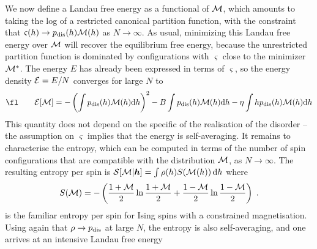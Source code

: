 \documentclass{iopart}
\begin{document}
We now define a Landau free energy as a functional of ${\cal M}$, which amounts to taking the log of a restricted canonical partition function, with the constraint that $\varsigma(h) \to p_{\rm dis}(h) {\cal M}(h)$ as $N\to\infty$.  As usual, minimizing this Landau free energy over ${\cal M}$ will recover the equilibrium free energy, because the unrestricted partition function is dominated by configurations with $\varsigma$ close to the minimizer ${\cal M}^*$.  
The energy $E$ has already been expressed in terms of $\varsigma$, so the energy density ${\cal E}=E/N$ converges for large $N$ to
\begin{eqnarray}
\fl\quad\quad
{\cal E}[\mm] =
- \left(\int \pdis(h) \mm(h) \mathrm{d}h \right)^{2} - B \int \pdis(h) \mm(h) \mathrm{d}h - \eta \int h \pdis(h) \mm(h) \mathrm{d}h 
\nonumber\\
\end{eqnarray}
This quantity does not depend on the specific of the realisation of the disorder -- the assumption on $\varsigma$ implies that the energy is self-averaging.
It remains to characterise the entropy, which can be computed in terms of the number of spin configurations that are compatible with the distribution ${\cal M}$, as $N\to\infty$.
The resulting entropy per spin is
${\cal S}[{\cal M}|\bm{h}] = \int  \rho(h) S({\cal M}(h)) \, \mathrm{d}h $ where
\begin{equation}
  \label{eq:entropy}
  S({\cal M}) = - \left( \frac{1+{\cal M}}{2} \ln \frac{1+{\cal M}}{2} + \frac{1-{\cal M}}{2}\ln\frac{1-{\cal M}}{2} \right) \; .
\end{equation}
is the familiar entropy per spin for Ising spins with a constrained magnetisation.
Using again that $\rho\to p_{\rm dis}$ at large $N$, the entropy is also self-averaging, and one arrives at an intensive Landau free energy
\end{document}
